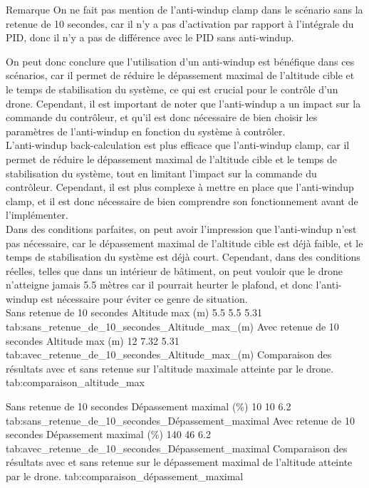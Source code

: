 \RemarkBox
{Remarque}
{
On ne fait pas mention de l'anti-windup clamp dans le scénario sans la retenue de 10 secondes, car il n'y a pas 
d'activation par rapport à l'intégrale du PID, donc il n'y a pas de différence avec le PID sans anti-windup.
}

On peut donc conclure que l'utilisation d'un anti-windup est bénéfique dans ces scénarios, car il permet de réduire le dépassement maximal de l'altitude cible et le temps de stabilisation du système, ce qui est crucial pour le contrôle d'un drone. Cependant, il est important de noter que l'anti-windup a un impact sur la commande du contrôleur, et qu'il est donc nécessaire de bien choisir les paramètres de l'anti-windup en fonction du système à contrôler. \\

L'anti-windup back-calculation est plus efficace que l'anti-windup clamp, car il permet de réduire le dépassement maximal de l'altitude cible et le temps de stabilisation du système, tout en limitant l'impact sur la commande du contrôleur. Cependant, il est plus complexe à mettre en place que l'anti-windup clamp, et il est donc nécessaire de bien comprendre son fonctionnement avant de l'implémenter. \\

Dans des conditions parfaites, on peut avoir l'impression que l'anti-windup n'est pas nécessaire, car le dépassement maximal de l'altitude cible est déjà faible, et le temps de stabilisation du système est déjà court. Cependant, dans des conditions réelles, telles que dans un intérieur de bâtiment, on peut vouloir que le drone n'atteigne jamais 5.5 mètres car il pourrait heurter le plafond, et donc l'anti-windup est nécessaire pour éviter ce genre de situation. \\

\DoubleComparisonTable
{
\ComparisonTable
    {Sans retenue de 10 secondes}
    {Altitude max (m)}
    {5.5}
    {5.5}
    {5.31}
    {tab:sans_retenue_de_10_secondes_Altitude_max_(m)}
}
{
\ComparisonTable
    {Avec retenue de 10 secondes}
    {Altitude max (m)}
    {12}
    {7.32}
    {5.31}
    {tab:avec_retenue_de_10_secondes_Altitude_max_(m)}
}
{Comparaison des résultats avec et sans retenue sur l'altitude maximale atteinte par le drone.}
{tab:comparaison_altitude_max}

\DoubleComparisonTable
{
    \ComparisonTable
        {Sans retenue de 10 secondes}
        {Dépassement maximal (\%)}
        {10}
        {10}
        {6.2}
        {tab:sans_retenue_de_10_secondes_Dépassement_maximal}
}
{
    \ComparisonTable
        {Avec retenue de 10 secondes}
        {Dépassement maximal (\%)}
        {140}
        {46}
        {6.2}
        {tab:avec_retenue_de_10_secondes_Dépassement_maximal}
}
{Comparaison des résultats avec et sans retenue sur le dépassement maximal de l'altitude atteinte par le drone.}
{tab:comparaison_dépassement_maximal}

